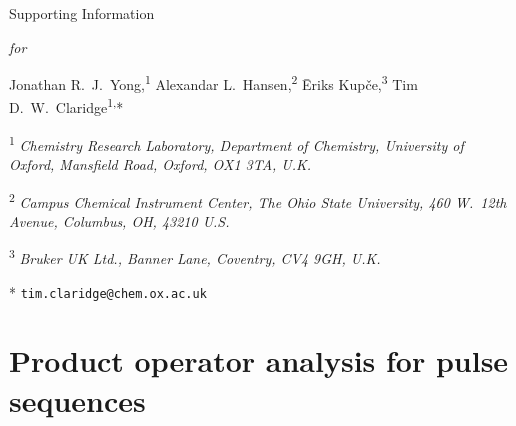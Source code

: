 \newcommand{\sectionbreak}{\clearpage}
\newcommand*{\aqeff}{\mathrm{AQ_{eff}}}
\renewcommand*{\thefigure}{S\arabic{figure}}
\renewcommand*{\thetable}{S\arabic{table}}
\renewcommand*{\thepage}{S\arabic{page}}
\setcounter{page}{1}
\setcounter{figure}{0}
\setcounter{table}{0}
\onehalfspacing
\hspace{0pt}
\vfill
\begin{center}
    \huge
    Supporting Information

    \textit{for}

    \hsqctitle{}

    \vspace{1cm}

    \Large Jonathan R.\ J.\ Yong,\textsuperscript{1} Alexandar L.\ Hansen,\textsuperscript{2} {\=E}riks Kup{\v{c}}e,\textsuperscript{3} Tim D.\ W.\ Claridge\textsuperscript{1,}*

    \vspace{1cm}

    \large \textsuperscript{1} \textit{Chemistry Research Laboratory, Department of Chemistry, University of Oxford, Mansfield Road, Oxford, OX1 3TA, U.K.}

    \textsuperscript{2} \textit{Campus Chemical Instrument Center, The Ohio State University, 460 W.\ 12th Avenue, Columbus, OH, 43210 U.S.}

    \textsuperscript{3} \textit{Bruker UK Ltd., Banner Lane, Coventry, CV4 9GH, U.K.}

    * \texttt{tim.claridge@chem.ox.ac.uk}
\end{center}
\thispagestyle{empty}
\vfill
\hspace{0pt}
\newpage

\tableofcontents

\newpage

\section{Product operator analysis for pulse sequences}

